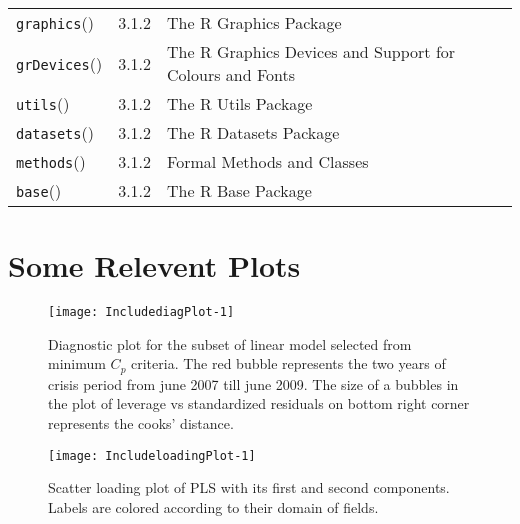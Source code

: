 \documentclass[12pt, lot, lof]{thesis}\usepackage[]{graphicx}\usepackage[]{color}
\makeatletter
\def\maxwidth{ %
  \ifdim\Gin@nat@width>\linewidth
    \linewidth
  \else
    \Gin@nat@width
  \fi
}
\makeatother
\begin{document}
\begin{tabularx}{\textwidth}{lrX}
  \texttt{graphics}(\cite{R2014Rcore}) & 3.1.2 & The R Graphics Package \\ 
  \texttt{grDevices}(\cite{R2014Rcore}) & 3.1.2 & The R Graphics Devices and Support for Colours and Fonts \\ 
  \texttt{utils}(\cite{R2014Rcore}) & 3.1.2 & The R Utils Package \\ 
  \texttt{datasets}(\cite{R2014Rcore}) & 3.1.2 & The R Datasets Package \\ 
  \texttt{methods}(\cite{R2014Rcore}) & 3.1.2 & Formal Methods and Classes \\ 
  \texttt{base}(\cite{R2014Rcore}) & 3.1.2 & The R Base Package \\ 
   \bottomrule
\end{tabularx}


  


\chapter{Some Relevent Plots}
\label{ch:revPlots}
\begin{Schunk}
\begin{figure}[h!]

{\centering \texttt{[image: IncludediagPlot-1]} 

}

\caption[Diagnostic plot for the subset of linear model selected from minimum ]{Diagnostic plot for the subset of linear model selected from minimum $C_p$ criteria. The red bubble represents the two years of crisis period from june 2007 till june 2009. The size of a bubbles in the plot of leverage vs standardized residuals on bottom right corner represents the cooks' distance.\label{fig:diagPlot}}
\end{figure}
\end{Schunk}

\begin{Schunk}
\begin{figure}[!h]

{\centering \texttt{[image: IncludeloadingPlot-1]} 

}

\caption[Scatter loading plot of PLS with its first and second components]{Scatter loading plot of PLS with its first and second components. Labels are colored according to their domain of fields.\label{fig:loadingPlot}}
\end{figure}
\end{Schunk}
\end{document}
